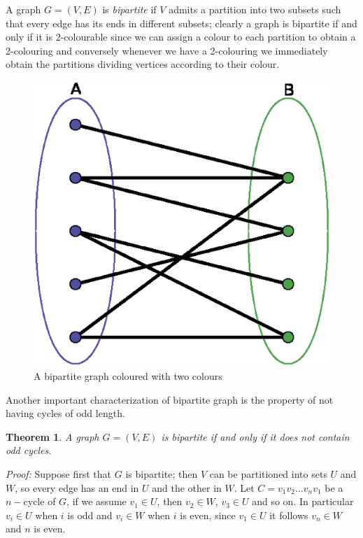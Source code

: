 \documentclass[a4paper,12pt,oneside]{book}
\newtheorem{theorem}{Theorem}[chapter]
\begin{document}
A graph $G=(V,E)$ is \textit{bipartite} if $V$ admits a partition into two subsets such that every edge has its ends in different subsets; clearly a graph is bipartite if and only if it is 2-colourable since we can assign a colour to each partition to obtain a 2-colouring and conversely whenever we have a 2-colouring we immediately obtain the partitions dividing vertices according to their colour. 
\begin{figure} 
\begin{center}
\includegraphics[scale=0.28]{bipartite.eps}
\caption{A bipartite graph coloured with two colours}\label{bip}
\end{center}
\end{figure}

\newpage
Another important characterization of bipartite graph is the property of not having cycles of odd length.
\begin{theorem}
A graph $G=(V,E)$ is bipartite if and only if it does not contain odd cycles.
\end{theorem}
\textit{Proof:}
Suppose first that $G$ is bipartite; then $V$ can be partitioned into sets $U$ and $W$, so every edge has an end in $U$ and the other in $W$. Let $C=v_1v_2...v_nv_1$ be a $n-$cycle of $G$, if we assume $v_1\in U$, then $v_2\in W$, $v_3\in U$ and so on.
In particular $v_i\in U $ when $i$ is odd and $v_i\in W$ when $i$ is even, since $v_1\in U$ it follows $v_n\in W$ and $n$ is even.
\end{document}
